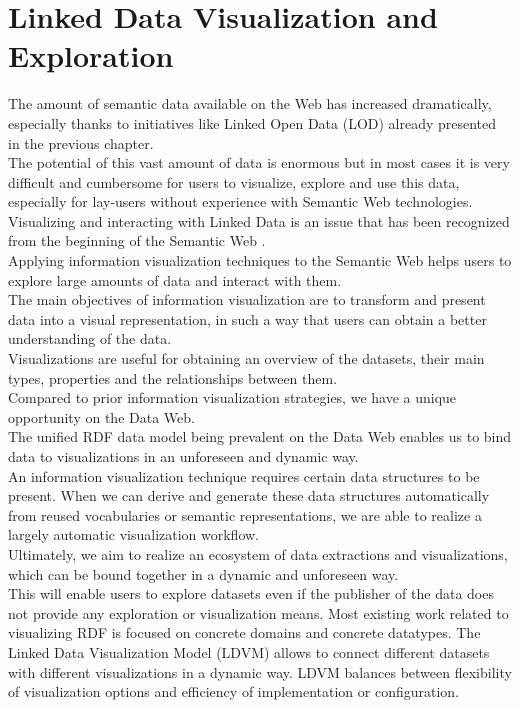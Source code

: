 \documentclass[a4paper,12pt,oneside]{report}
\begin{document}
{{{\section{Linked Data Visualization and Exploration}
{The amount of semantic data available on the Web has increased dramatically, especially thanks to initiatives like Linked Open Data (LOD)  already presented in the previous chapter. \\
The potential of this vast amount of data is enormous but in most cases it is very difficult and cumbersome for users to visualize, explore and use this data, especially for lay-users  without experience with Semantic Web technologies.\\
Visualizing and interacting with Linked Data is an issue that has been recognized from the beginning of the Semantic Web .\\
Applying information visualization techniques to the Semantic Web helps users to explore large amounts of data and interact with them.\\
The main objectives of information visualization are to transform and present data into a visual representation, in such a way that users can obtain a better understanding of the data.\\
 Visualizations are useful for obtaining an overview of the datasets, their main types, properties and the relationships between them.\\
Compared to prior information visualization strategies, we have a unique opportunity on the Data Web.\\
 The unified RDF data model being prevalent on the Data Web enables us to bind data to visualizations in an unforeseen and dynamic way.\\
 An information visualization technique requires certain data structures to be present. When we can derive and generate these data structures automatically from reused vocabularies or semantic representations, we are able to realize a largely automatic visualization workflow.\\ Ultimately, we aim to realize an ecosystem of data extractions and visualizations, which can be bound together in a dynamic and unforeseen way.\\
 This will enable users to explore datasets even if the publisher of the data does not provide any exploration or visualization means.
Most existing work related to visualizing RDF is focused on concrete domains and concrete datatypes. The Linked Data Visualization Model (LDVM)  allows to connect different datasets with different visualizations in a dynamic way. LDVM balances between flexibility of visualization options and efficiency of implementation or configuration. }
}}}
\end{document}
